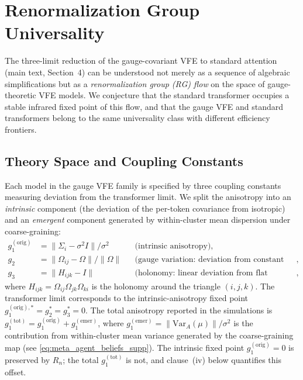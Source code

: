 \documentclass[twoside,11pt]{article}
\begin{document}
\section{Renormalization Group Universality}
\label{app:rg_universality}

The three-limit reduction of the gauge-covariant VFE to standard attention (main text, Section~4) can be understood not merely as a sequence of algebraic simplifications but as a \emph{renormalization group (RG) flow} on the space of gauge-theoretic VFE models. We conjecture that the standard transformer occupies a stable infrared fixed point of this flow, and that the gauge VFE and standard transformers belong to the same universality class with different efficiency frontiers.

\subsection{Theory Space and Coupling Constants}

Each model in the gauge VFE family is specified by three coupling constants measuring deviation from the transformer limit. We split the anisotropy into an \emph{intrinsic} component (the deviation of the per-token covariance from isotropic) and an \emph{emergent} component generated by within-cluster mean dispersion under coarse-graining:
\begin{align}
g_1^{(\mathrm{orig})} &= \|\Sigma_i - \sigma^2 I\| / \sigma^2 & &\text{(intrinsic anisotropy)}, \label{eq:g1_def_supp} \\
g_2 &= \|\Omega_{ij} - \Omega\| / \|\Omega\| & &\text{(gauge variation: deviation from constant transport)}, \label{eq:g2_def_supp} \\
g_3 &= \|H_{ijk} - I\| & &\text{(holonomy: linear deviation from flat bundle)}, \label{eq:g3_def_supp}
\end{align}
where $H_{ijk} = \Omega_{ij} \Omega_{jk} \Omega_{ki}$ is the holonomy around the triangle $(i,j,k)$. The transformer limit corresponds to the intrinsic-anisotropy fixed point $g_1^{(\mathrm{orig}),*} = g_2^* = g_3^* = 0$. The total anisotropy reported in the simulations is $g_1^{(\mathrm{tot})} = g_1^{(\mathrm{orig})} + g_1^{(\mathrm{emer})}$, where $g_1^{(\mathrm{emer})} = \|\mathrm{Var}_A(\mu)\|/\sigma^2$ is the contribution from within-cluster mean variance generated by the coarse-graining map (see \eqref{eq:meta_agent_beliefs_supp}). The intrinsic fixed point $g_1^{(\mathrm{orig})} = 0$ is preserved by $R_n$; the total $g_1^{(\mathrm{tot})}$ is not, and clause~(iv) below quantifies this offset.
\end{document}
